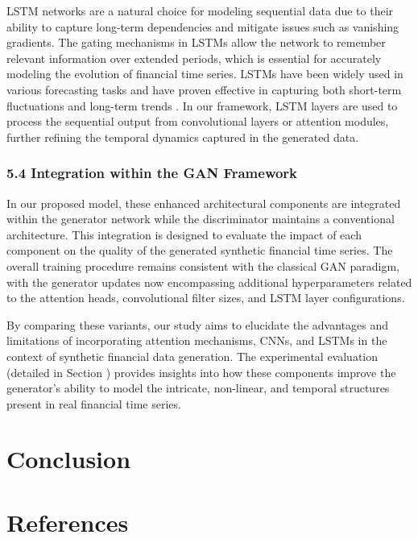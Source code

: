 \documentclass{article}
\begin{document}
LSTM networks are a natural choice for modeling sequential data due to their ability to capture long-term dependencies and mitigate issues such as vanishing gradients. The gating mechanisms in LSTMs allow the network to remember relevant information over extended periods, which is essential for accurately modeling the evolution of financial time series. LSTMs have been widely used in various forecasting tasks and have proven effective in capturing both short-term fluctuations and long-term trends . In our framework, LSTM layers are used to process the sequential output from convolutional layers or attention modules, further refining the temporal dynamics captured in the generated data.

\subsubsection*{5.4 Integration within the GAN Framework}

In our proposed model, these enhanced architectural components are integrated within the generator network while the discriminator maintains a conventional architecture. This integration is designed to evaluate the impact of each component on the quality of the generated synthetic financial time series. The overall training procedure remains consistent with the classical GAN paradigm, with the generator updates now encompassing additional hyperparameters related to the attention heads, convolutional filter sizes, and LSTM layer configurations.

By comparing these variants, our study aims to elucidate the advantages and limitations of incorporating attention mechanisms, CNNs, and LSTMs in the context of synthetic financial data generation. The experimental evaluation (detailed in Section ) provides insights into how these components improve the generator's ability to model the intricate, non-linear, and temporal structures present in real financial time series.


\section{Conclusion}

\section{References}
\printbibliography
\end{document}
